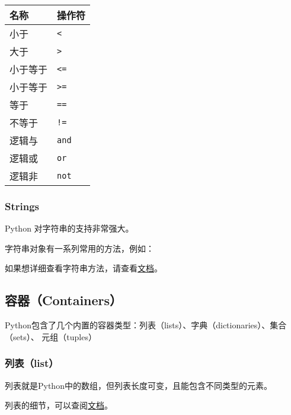 \begin{table}[htbp]
  \centering
  \begin{tabular}{l|l}\hline
    名称&操作符\\\hline
    小于& \lstinline|<| \\
    大于& \lstinline|>| \\
    小于等于& \lstinline|<=| \\
    小于等于& \lstinline|>=| \\
    等于&\lstinline|==|\\
    不等于&\lstinline|!=|\\
    逻辑与&\lstinline|and|\\
    逻辑或&\lstinline|or|\\
    逻辑非&\lstinline|not|\\\hline
  \end{tabular}
\end{table}

\subsubsection{Strings}
Python 对字符串的支持非常强大。




字符串对象有一系列常用的方法，例如：



如果想详细查看字符串方法，请查看\href{https://docs.python.org/3.5/library/stdtypes.html#string-methods}{文档}。


\subsection{容器（Containers）}

Python包含了几个内置的容器类型：列表（lists）、字典（dictionaries）、集合（sets）、 元组（tuples）

\subsubsection{列表（list）}


列表就是Python中的数组，但列表长度可变，且能包含不同类型的元素。 

列表的细节，可以查阅\href{https://docs.python.org/3.5/tutorial/datastructures.html#more-on-lists}{文档}。

